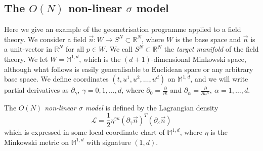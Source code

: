 





\subsection{The $O(N)$ non-linear $\sigma$ model} \label{sec:The O(3) non-linear sigma model}

Here we give an example of the geometrisation programme applied to a field theory. We consider a field $\vec{n} : W \to S^N \subset \mathbb{R}^N$, where $W$ is the base space and $\vec{n}$ is a unit-vector in $\mathbb{R}^N$ for all $p \in W$. We call $S^N \subset \mathbb{R}^N$ the \textit{target manifold} of the field theory. We let $W = \mathbb{M}^{1,d}$, which is the $(d+1)$-dimensional Minkowski space, although what follows is easily generalisable to Euclidean space or any arbitrary base space.  
 We define coordinates $(t, u^1, u^2, \dots, u^d)$ on $\mathbb{M}^{1,d}$, and we will write partial derivatives as $\partial_\gamma,\ \gamma=0,1,\dots,d$, where $\partial_0 = \frac{\partial}{\partial t}$ and $\partial_\alpha = \frac{\partial}{\partial u^\alpha},\ \alpha=1,\dots,d$.

The \textit{$O(N)$ non-linear $\sigma$ model} \citep{ketovQuantumNonlinearSigmaModels2013} is defined by the Lagrangian density
\begin{equation} \label{eq:O(N) model}
\mathcal{L} = \frac{1}{2} \eta^{\gamma \kappa} (\partial_\gamma \vec{n})^T (\partial_\kappa \vec{n}) 
\end{equation}
which is expressed in some local coordinate chart of $\mathbb{M}^{1,d}$, where $\eta$ is the Minkowski metric on $\mathbb{M}^{1,d}$ with signature $(1,d)$.

